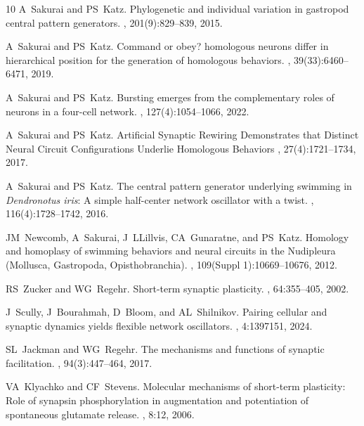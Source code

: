 \documentclass[nofootinbib,aip,amsmath,amssymb,reprint,twocolumn,10pt]{revtex4-2}
\begin{document}
\begin{thebibliography}{10}
A~Sakurai and PS~Katz.
\newblock Phylogenetic and individual variation in gastropod central pattern
  generators.
, 201(9):829--839, 2015.


A~Sakurai and PS~Katz.
\newblock Command or obey? homologous neurons differ in hierarchical position
  for the generation of homologous behaviors.
, 39(33):6460--6471, 2019.

A~Sakurai and PS~Katz.
\newblock Bursting emerges from the complementary roles of neurons in a
  four-cell network.
, 127(4):1054--1066, 2022.



A~Sakurai and PS~Katz.
\newblock Artificial Synaptic Rewiring Demonstrates that Distinct Neural Circuit Configurations
Underlie Homologous Behaviors , 27(4):1721--1734, 2017.


A~Sakurai and PS~Katz.
\newblock  The central pattern generator underlying swimming in \emph{Dendronotus iris}: A simple half-center network oscillator with a twist.
 , 116(4):1728--1742, 2016.


JM~Newcomb, A~Sakurai, J~LLillvis, CA~Gunaratne, and PS~Katz.
\newblock Homology and homoplasy of swimming behaviors and neural circuits in the Nudipleura (Mollusca, Gastropoda, Opisthobranchia).
, 109(Suppl 1):10669--10676, 2012.

RS~Zucker and WG~Regehr.
\newblock Short-term synaptic plasticity.
, 64:355--405, 2002.

J~Scully, J~Bourahmah, D~Bloom, and AL~Shilnikov.
\newblock Pairing cellular and synaptic dynamics yields flexible network oscillators.
, 4:1397151, 2024.

SL~Jackman and WG~Regehr.
\newblock The mechanisms and functions of synaptic facilitation.
, 94(3):447--464, 2017.

VA~Klyachko and CF~Stevens.
\newblock Molecular mechanisms of short-term plasticity: Role of synapsin phosphorylation in augmentation and potentiation of spontaneous glutamate release.
, 8:12, 2006.


\end{thebibliography}
\end{document}
